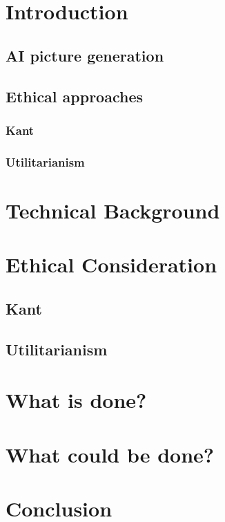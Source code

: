 \documentclass[11pt]{article}
\begin{document}
\section{Introduction}
\subsection{AI picture generation}
\subsection{Ethical approaches}
\subsubsection{Kant}
\subsubsection{Utilitarianism}
\section{Technical Background}
\section{Ethical Consideration}
\subsection{Kant}
\subsection{Utilitarianism}
\section{What is done?}
\section{What could be done?}
\section{Conclusion}
\end{document}

